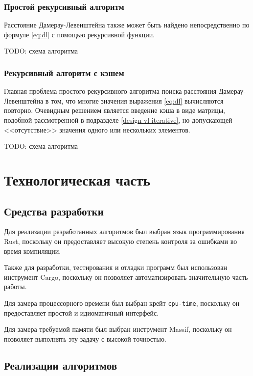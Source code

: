 \documentclass{report}
\begin{document}
\subsection{Простой рекурсивный алгоритм}

Расстояние Дамерау-Левенштейна также может быть найдено
непосредственно по формуле \ref{eq:dl} с помощью рекурсивной
функции.

TODO: схема алгоритма

\subsection{Рекурсивный алгоритм с кэшем}

Главная проблема простого рекурсивного алгоритма поиска расстояния
Дамерау-Левенштейна в том, что многие значения выражения
\ref{eq:dl} вычисляются повторно. Очевидным решением является
введение кэша в виде матрицы, подобной рассмотренной в подразделе
\ref{design-vl-iterative}, но допускающей <<отсутствие>> значения
одного или нескольких элементов.

TODO: схема алгоритма

\chapter{Технологическая часть}

\section{Средства разработки}

Для реализации разработанных алгоритмов был выбран язык
программирования Rust, поскольку он предоставляет высокую степень
контроля за ошибками во время компиляции.

Также для разработки, тестирования и отладки программ был
использован инструмент Cargo, поскольку он позволяет
автоматизировать значительную часть работы.

Для замера процессорного времени был выбран крейт
\texttt{cpu-time}, поскольку он предоставляет простой и
идиоматичный интерфейс.

Для замера требуемой памяти был выбран инструмент Massif,
поскольку он позволяет выполнять эту задачу с высокой точностью.

\section{Реализации алгоритмов}
\end{document}
